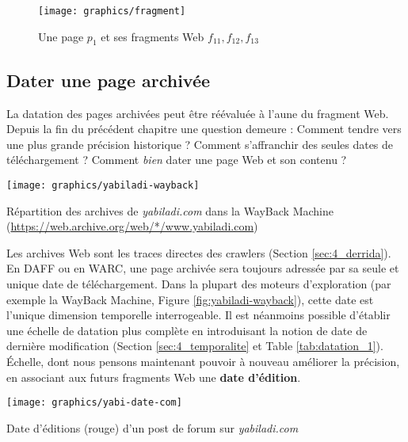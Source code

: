 \documentclass[symmetric,justified,marginals=raggedouter]{tufte-book}
\begin{document}
\begin{figure}%
  \texttt{[image: graphics/fragment]}
  \caption{Une page $p_1$ et ses fragments Web $f_{11}, f_{12}, f_{13}$}
  \label{fig:fragment}
\end{figure}

\subsection{Dater une page archivée}

\noindent La datation des pages archivées peut être réévaluée à l'aune du fragment Web. Depuis la fin du précédent chapitre une question demeure : Comment tendre vers une plus grande précision historique ? Comment s'affranchir des seules dates de téléchargement ? Comment \textit{bien} dater une page Web et son contenu ?

\begin{marginfigure}%
  \texttt{[image: graphics/yabiladi-wayback]}
  \caption{Répartition des archives de \textit{yabiladi.com} dans la WayBack Machine (\url{https://web.archive.org/web/*/www.yabiladi.com})}
  \label{fig:yabiladi-wayback}
\end{marginfigure}

Les archives Web sont les traces directes des crawlers (Section \ref{sec:4_derrida}). En DAFF ou en WARC, une page archivée sera toujours adressée par sa seule et unique date de téléchargement. Dans la plupart des moteurs d'exploration (par exemple la WayBack Machine, Figure \ref{fig:yabiladi-wayback}), cette date est l'unique dimension temporelle interrogeable. Il est néanmoins possible d'établir une échelle de datation plus complète en introduisant la notion de date de dernière modification (Section \ref{sec:4_temporalite} et Table \ref{tab:datation_1}). Échelle, dont nous pensons maintenant pouvoir à nouveau améliorer la précision, en associant aux futurs fragments Web une \textbf{date d'édition}. 

\begin{marginfigure}%
  \texttt{[image: graphics/yabi-date-com]}
  \caption{Date d'éditions (rouge) d'un post de forum sur \textit{yabiladi.com}}
  \label{fig:yabi-date-com}
\end{marginfigure}  
\end{document}
